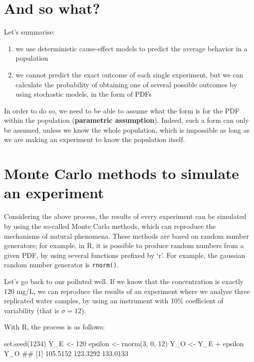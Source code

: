 \documentclass[a4paper,12pt,oneside]{book}
\providecommand{\tightlist}{%
  \setlength{\itemsep}{0pt}\setlength{\parskip}{0pt}}
\newenvironment{Shaded}{\begin{snugshade}}{\end{snugshade}}
\newcommand{\DecValTok}[1]{#1}
\newcommand{\SpecialCharTok}[1]{#1}
\newcommand{\DocumentationTok}[1]{#1}
\newcommand{\OtherTok}[1]{#1}
\newcommand{\FunctionTok}[1]{#1}
\newcommand{\NormalTok}[1]{#1}
\begin{document}
\hypertarget{and-so-what}{%
\section{And so what?}\label{and-so-what}}

Let's summarise:

\begin{enumerate}
\def\labelenumi{\arabic{enumi}.}
\tightlist
\item
  we use deterministic cause-effect models to predict the average behavior in a population
\item
  we cannot predict the exact outcome of each single experiment, but we can calculate the probability of obtaining one of several possible outcomes by using stochastic models, in the form of PDFs
\end{enumerate}

In order to do so, we need to be able to assume what the form is for the PDF within the population (\textbf{parametric assumption}). Indeed, such a form can only be assumed, unless we know the whole population, which is impossible as long as we are making an experiment to know the population itself.

\hypertarget{monte-carlo-methods-to-simulate-an-experiment}{%
\section{Monte Carlo methods to simulate an experiment}\label{monte-carlo-methods-to-simulate-an-experiment}}

Considering the above process, the results of every experiment can be simulated by using the so-called Monte Carlo methods, which can reproduce the mechanisms of natural phenomena. These methods are based on random number generators; for example, in R, it is possible to produce random numbers from a given PDF, by using several functions prefixed by `r'. For example, the gaussian random number generator is \texttt{rnorm()}.

Let's go back to our polluted well. If we know that the concentration is exactly 120 mg/L, we can reproduce the results of an experiment where we analyse three replicated water samples, by using an instrument with 10\% coefficient of variability (that is \(\sigma = 12\)).

With R, the process is as follows:

\begin{Shaded}
\begin{Highlighting}[]
\FunctionTok{set.seed}\NormalTok{(}\DecValTok{1234}\NormalTok{)}
\NormalTok{Y\_E }\OtherTok{\textless{}{-}} \DecValTok{120}
\NormalTok{epsilon }\OtherTok{\textless{}{-}} \FunctionTok{rnorm}\NormalTok{(}\DecValTok{3}\NormalTok{, }\DecValTok{0}\NormalTok{, }\DecValTok{12}\NormalTok{)}
\NormalTok{Y\_O }\OtherTok{\textless{}{-}}\NormalTok{ Y\_E }\SpecialCharTok{+}\NormalTok{ epsilon}
\NormalTok{Y\_O}
\DocumentationTok{\#\# [1] 105.5152 123.3292 133.0133}
\end{Highlighting}
\end{Shaded}
\end{document}
